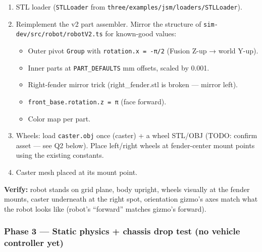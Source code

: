 \documentclass[
]{article}
\providecommand{\tightlist}{%
  \setlength{\itemsep}{0pt}\setlength{\parskip}{0pt}}
\begin{document}
\begin{enumerate}
\def\labelenumi{\arabic{enumi}.}
\tightlist
\item
  STL loader (\texttt{STLLoader} from
  \texttt{three/examples/jsm/loaders/STLLoader}).
\item
  Reimplement the v2 part assembler. Mirror the structure of
  \texttt{sim-dev/src/robot/robotV2.ts} for known-good values:

  \begin{itemize}
  \tightlist
  \item
    Outer pivot \texttt{Group} with \texttt{rotation.x\ =\ -π/2} (Fusion
    Z-up → world Y-up).
  \item
    Inner parts at \texttt{PART\_DEFAULTS} mm offsets, scaled by 0.001.
  \item
    Right-fender mirror trick (right\_fender.stl is broken --- mirror
    left).
  \item
    \texttt{front\_base.rotation.z\ =\ π} (face forward).
  \item
    Color map per part.
  \end{itemize}
\item
  Wheels: load \texttt{caster.obj} once (caster) + a wheel STL/OBJ
  (TODO: confirm asset --- see Q2 below). Place left/right wheels at
  fender-center mount points using the existing constants.
\item
  Caster mesh placed at its mount point.
\end{enumerate}

\textbf{Verify:} robot stands on grid plane, body upright, wheels
visually at the fender mounts, caster underneath at the right spot,
orientation gizmo's axes match what the robot looks like (robot's
``forward'' matches gizmo's forward).

\subsubsection{Phase 3 --- Static physics + chassis drop test (no
vehicle controller
yet)}\label{phase-3-static-physics-chassis-drop-test-no-vehicle-controller-yet}
\end{document}
